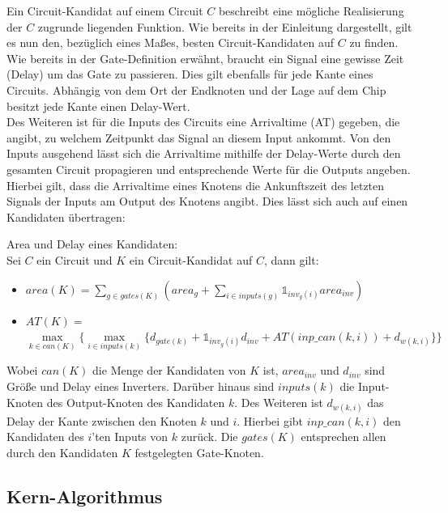 \documentclass[11pt, a4paper, german]{article}
\begin{document}
Ein Circuit-Kandidat auf einem Circuit $C$ beschreibt eine mögliche Realisierung der $C$ zugrunde liegenden Funktion.  Wie bereits in der Einleitung dargestellt, gilt es nun den, bezüglich eines Ma{\ss}es, besten Circuit-Kandidaten auf $C$ zu finden.\\

Wie bereits in der Gate-Definition erwähnt, braucht ein Signal eine gewisse Zeit (Delay) um das Gate zu passieren. Dies gilt ebenfalls für jede Kante eines Circuits. Abhängig von dem Ort der Endknoten und der Lage auf dem Chip besitzt jede Kante einen Delay-Wert. \\
Des Weiteren ist für die Inputs des Circuits eine Arrivaltime (AT) gegeben, die angibt, zu welchem Zeitpunkt das Signal an diesem Input ankommt. Von den Inputs ausgehend lässt sich die Arrivaltime mithilfe der Delay-Werte durch den gesamten Circuit propagieren und entsprechende Werte für die Outputs angeben. Hierbei gilt, dass die Arrivaltime eines Knotens die Ankunftszeit des letzten Signals der Inputs am Output des Knotens angibt. Dies lässt sich auch auf einen Kandidaten übertragen:

\begin{definition}{Area und Delay eines Kandidaten:}\\
\label{def:area_delay}
Sei $C$ ein Circuit und $K$ ein Circuit-Kandidat auf $C$, dann gilt: \\
\begin{itemize}
\item $area(K) = \sum_{g \in gates(K)} (area_g + \sum_{i \in inputs(g)} \mathbb{1}_{inv_g(i)} area_{inv})$ 
\item $AT(K) = $\\$  \max\limits_{k \in can(K)} \{\max\limits_{i \in inputs(k)} \{   d_{gate(k)} + \mathbb{1}_{inv_g(i)} d_{inv} + AT(inp\_can(k,i)) + d_{w(k,i)} \} \}$ 
\end{itemize}
Wobei $can(K)$ die Menge der Kandidaten von $K$ ist, $area_{inv}$ und $d_{inv}$ sind Größe und Delay eines Inverters. Darüber hinaus sind $inputs(k)$ die Input-Knoten des Output-Knoten des Kandidaten $k$. Des Weiteren ist $d_{w(k,i)} $ das Delay der Kante zwischen den Knoten $k$ und $i$. Hierbei gibt $inp\_can(k,i)$ den Kandidaten des $i$'ten Inputs von $k$ zurück. 
Die $gates(K)$ entsprechen allen durch den Kandidaten $K$ festgelegten Gate-Knoten. 

\end{definition}

\subsection{Kern-Algorithmus}
\label{subsec:kern_algorithmus}
\end{document}
